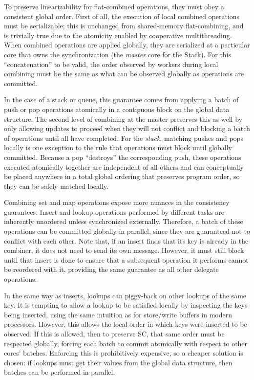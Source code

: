 To preserve linearizability for flat-combined operations, they must obey a consistent global order.
First of all, the execution of local combined operations must be serializable;
this is unchanged from shared-memory flat-combining, and is trivially true due to the atomicity enabled by cooperative multithreading.
When combined operations are applied globally, they are serialized at a particular core that owns the synchronization (the \emph{master} core for the Stack).
For this ``concatenation'' to be valid, the order observed by workers during local combining must be the same as what can be observed globally as operations are committed.

In the case of a stack or queue, this guarantee comes from applying a batch of push or pop operations atomically in a contiguous block on the global data structure. The second level of combining at the master preserves this as well by only allowing updates to proceed when they will not conflict and blocking a batch of operations until all have completed.
For the \emph{stack}, matching pushes and pops locally is one exception to the rule that operations must block until globally committed. Because a pop ``destroys'' the corresponding push, these operations executed atomically together are independent of all others and can conceptually be placed anywhere in a total global ordering that preserves program order, so they can be safely matched locally.

Combining set and map operations expose more nuances in the consistency guarantees.
Insert and lookup operations performed by different tasks are inherently unordered unless synchronized externally.
Therefore, a batch of these operations can be committed globally in parallel, since they are guaranteed not to conflict with each other.
Note that, if an insert finds that its key is already in the combiner, it does not need to send its own message. However, it must still block until that insert is done to ensure that a subsequent operation it performs cannot be reordered with it, providing the same guarantee as all other delegate operations. 

In the same way as inserts, lookups can piggy-back on other lookups of the same key.
It is tempting to allow a lookup to be satisfied locally by inspecting the keys being inserted, using the same intuition as for store/write buffers in modern processors.
However, this allows the local order in which keys were inserted to be observed.
If this is allowed, then to preserve SC, that same order must be respected globally, forcing each batch to commit atomically with respect to other cores' batches. Enforcing this is prohibitively expensive, so a cheaper solution is chosen: if lookups must get their values from the global data structure, then batches can be performed in parallel.

